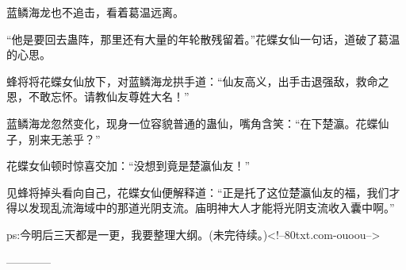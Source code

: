 \begin{this_body}
蓝鳞海龙也不追击，看着葛温远离。

“他是要回去蛊阵，那里还有大量的年轮散残留着。”花蝶女仙一句话，道破了葛温的心思。

蜂将将花蝶女仙放下，对蓝鳞海龙拱手道：“仙友高义，出手击退强敌，救命之恩，不敢忘怀。请教仙友尊姓大名！”

蓝鳞海龙忽然变化，现身一位容貌普通的蛊仙，嘴角含笑：“在下楚瀛。花蝶仙子，别来无恙乎？”

花蝶女仙顿时惊喜交加：“没想到竟是楚瀛仙友！”

见蜂将掉头看向自己，花蝶女仙便解释道：“正是托了这位楚瀛仙友的福，我们才得以发现乱流海域中的那道光阴支流。庙明神大人才能将光阴支流收入囊中啊。”

ps:今明后三天都是一更，我要整理大纲。(未完待续。)<!--80txt.com-ouoou-->

------------

\end{this_body}

